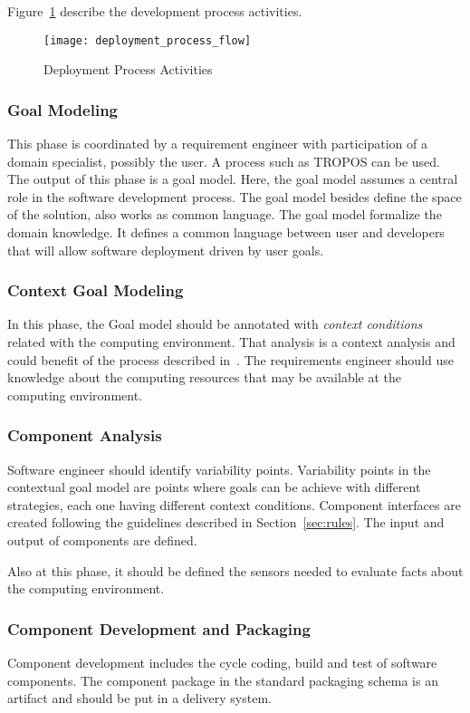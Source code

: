 Figure~\ref{fig:deployment_process_flow} describe the development process activities.

\label{sub:Proposal}
\begin{figure}[!htb]
  \centering
  \texttt{[image: deployment\_process\_flow]}
  \caption{Deployment Process Activities}
\label{fig:deployment_process_flow}
\end{figure}

\subsubsection{Goal Modeling}
This phase is coordinated by a requirement engineer with participation of a domain specialist, possibly the user.
A process such as TROPOS can be used. The output of this phase is a goal model.
Here, the goal model assumes a central role in the software development process. The goal model besides define the space of the solution, also works as common language. The goal model formalize the domain knowledge. It defines a common language between user and developers that will allow software deployment driven by user goals.


\subsubsection{Context Goal Modeling}
In this phase, the Goal model should be annotated with \emph{context conditions} related with the computing environment. That analysis is a context analysis and could benefit of the process described in~\cite{ali_goal-based_2010}. The requirements engineer should use knowledge about the computing resources that may be available at the computing environment.


\subsubsection{Component Analysis}
Software engineer should identify variability points.
Variability points in the contextual goal model are points where goals can be achieve with different strategies, each one having different context conditions.
Component interfaces are created following the guidelines described in Section~\ref{sec:rules}. The input and output of components are defined.

Also at this phase, it should be defined the sensors needed to evaluate facts about the computing environment.

\subsubsection{Component Development and Packaging}

Component development includes the cycle coding, build and test of software components.
The component package in the standard packaging schema is an artifact and should be put in a delivery system.
